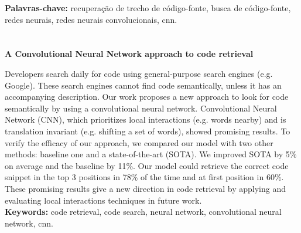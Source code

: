 \documentclass[12pt,oneside,a4paper]{book} %
\begin{document}
\noindent \textbf{Palavras-chave:} recuperação de trecho de código-fonte, busca de código-fonte, redes neurais, redes neurais convolucionais, cnn.

\chapter*{}
\thispagestyle{empty}
\begin{center}\textbf{A Convolutional Neural Network approach to code retrieval}
\\
\end{center}
Developers search daily for code using general-purpose search engines (e.g. Google). These search engines cannot find code semantically, unless it has an accompanying description. Our work proposes a new approach to look for code semantically by using a convolutional neural network. Convolutional Neural Network (CNN), which prioritizes local interactions (e.g. words nearby) and is translation invariant (e.g. shifting a set of words), showed promising results. To verify the efficacy of our approach, we compared our model with two other methods: baseline one and a state-of-the-art (SOTA). We improved SOTA by 5\% on average and the baseline by 11\%. Our model could retrieve the correct code snippet in the top 3 positions in 78\% of the time and at first position in 60\%. These promising results give a new direction in code retrieval by applying and evaluating local interactions techniques in future work.
\\

\noindent \textbf{Keywords:} code retrieval, code search, neural network, convolutional neural network, cnn.




\end{document}
